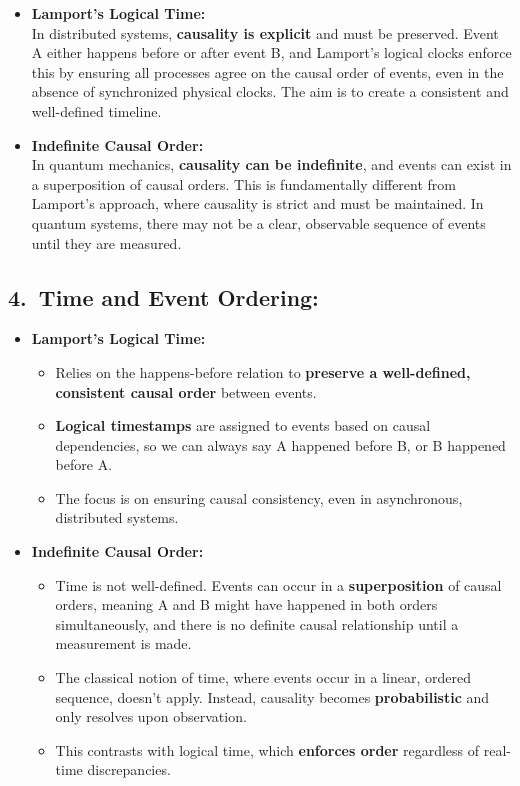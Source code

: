 \documentclass[../../../OAE-SPEC-MAIN.tex]{subfiles}
\begin{document}
\begin{itemize}[leftmargin=1.5em]
\item \textbf{Lamport’s Logical Time:}\\
  In distributed systems, \textbf{causality is explicit} and must be preserved. Event A either happens before or after event B, and Lamport’s logical clocks enforce this by ensuring all processes agree on the causal order of events, even in the absence of synchronized physical clocks. The aim is to create a consistent and well-defined timeline.
\item \textbf{Indefinite Causal Order:}\\
  In quantum mechanics, \textbf{causality can be indefinite}, and events can exist in a superposition of causal orders. This is fundamentally different from Lamport’s approach, where causality is strict and must be maintained. In quantum systems, there may not be a clear, observable sequence of events until they are measured.
\end{itemize}

\subsection*{4.\ Time and Event Ordering:}

\begin{itemize}[leftmargin=1.5em]
\item \textbf{Lamport’s Logical Time:}
  \begin{itemize}[leftmargin=1.25em]
  \item Relies on the happens-before relation to \textbf{preserve a well-defined, consistent causal order} between events.
  \item \textbf{Logical timestamps} are assigned to events based on causal dependencies, so we can always say A happened before B, or B happened before A.
  \item The focus is on ensuring causal consistency, even in asynchronous, distributed systems.
  \end{itemize}
\item \textbf{Indefinite Causal Order:}
  \begin{itemize}[leftmargin=1.25em]
  \item Time is not well-defined. Events can occur in a \textbf{superposition} of causal orders, meaning A and B might have happened in both orders simultaneously, and there is no definite causal relationship until a measurement is made.
  \item The classical notion of time, where events occur in a linear, ordered sequence, doesn’t apply. Instead, causality becomes \textbf{probabilistic} and only resolves upon observation.
  \item This contrasts with logical time, which \textbf{enforces order} regardless of real-time discrepancies.
  \end{itemize}
\end{itemize}
\end{document}
